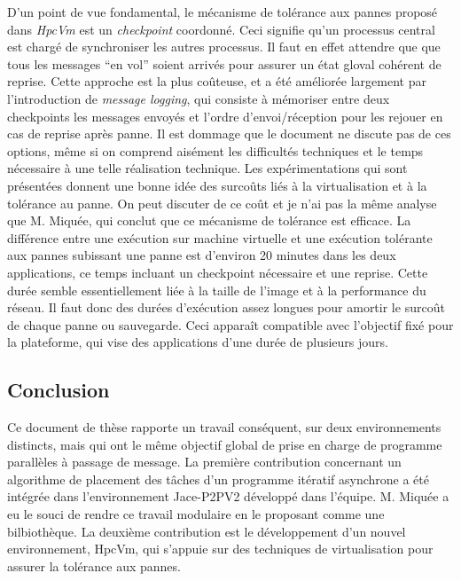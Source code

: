 \documentclass[a4paper,12pt]{article}
\begin{document}
D'un point de vue fondamental, le mécanisme de tolérance aux pannes
proposé dans \textit{HpcVm} est un \emph{checkpoint} coordonné. Ceci
signifie qu'un processus central est chargé de synchroniser les
autres processus. Il faut en effet attendre que que tous les messages
``en vol'' soient arrivés pour assurer un état gloval cohérent de reprise.
Cette approche est la plus coûteuse, et a été améliorée largement
par l'introduction de \emph{message logging}, qui consiste à
mémoriser entre deux checkpoints les messages envoyés et l'ordre
d'envoi/réception pour les rejouer en cas de reprise après panne. 
Il est dommage que le document ne discute pas de ces options, même
si on comprend aisément les difficultés techniques et le temps nécessaire
à une telle réalisation technique. 
Les expérimentations qui sont présentées donnent une bonne idée des surcoûts
liés à la virtualisation et à la tolérance au panne. On peut discuter 
de ce coût et je n'ai pas la même analyse que M. Miquée, qui conclut
que ce mécanisme de tolérance est efficace. La différence entre une
exécution sur machine virtuelle et une exécution tolérante aux pannes
subissant une panne est d'environ 20 minutes dans les deux applications,
ce temps incluant un checkpoint nécessaire et une reprise.
Cette durée semble essentiellement liée à la taille de l'image et à la 
performance du réseau. Il faut donc des durées d'exécution assez longues 
pour amortir le surcoût de chaque panne ou sauvegarde. Ceci apparaît
compatible avec l'objectif fixé pour la plateforme, qui vise des 
applications d'une durée de plusieurs jours.



\subsection*{Conclusion}
\vspace{-3mm}
Ce document de thèse rapporte un travail conséquent, sur deux environnements
distincts, mais qui ont le même objectif global de prise en charge de programme
parallèles à passage de message. La première contribution concernant un 
algorithme de placement des tâches d'un programme itératif asynchrone a été 
intégrée dans l'environnement Jace-P2PV2 développé dans l'équipe. M. Miquée
a eu le souci de rendre ce travail modulaire en le proposant comme une
bilbiothèque. La deuxième contribution est le développement d'un nouvel
environnement, HpcVm, qui s'appuie sur des techniques de virtualisation
pour assurer la tolérance aux pannes. 
\end{document}
